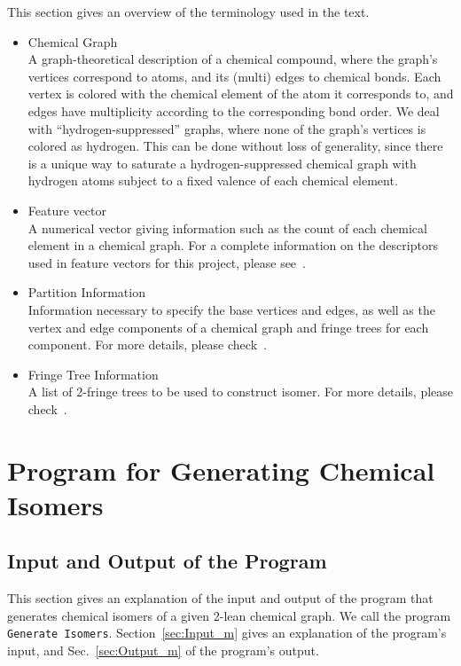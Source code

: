 \documentclass[11pt,titlepage,dvipdfmx,twoside]{article}
\begin{document}
This section gives an overview of the terminology used in the text.
%
\begin{itemize}
%
\item Chemical Graph\\
A graph-theoretical description of a chemical compound, 
where the graph's vertices correspond to atoms, and
its (multi) edges to chemical bonds.
Each vertex is colored with the chemical element of the atom it corresponds to,
and edges have multiplicity according to the corresponding bond order.
We deal with ``hydrogen-suppressed'' graphs, 
where none of the graph's vertices is colored as hydrogen.
This can be done without loss of generality,
since there is a unique way to saturate a hydrogen-suppressed chemical graph 
with hydrogen atoms subject to a fixed valence of each chemical element.


\item Feature vector\\
A numerical vector giving information such as the count of
each chemical element in a chemical graph.
For a complete information on the descriptors used in feature vectors for
this project, please see~\cite{branch}.



\item Partition Information\\
Information necessary to specify the base vertices and edges, as well as the vertex and edge components
of a chemical graph and fringe trees for each component.
For more details, please check~\cite{branch}.

\item Fringe Tree Information\\
A list of 2-fringe trees to be used to construct isomer. 
For more details, please check~\cite{branch}.


\end{itemize}


\section{Program for Generating Chemical Isomers}
\label{sec: main}

\subsection{Input and Output of the Program}
\label{sec:InOut_m}

This section gives an explanation of the input and output
of the program that generates chemical isomers
of a given 2-lean chemical graph.
We call the program {\tt Generate Isomers}.
Section~\ref{sec:Input_m} gives an explanation of the program's input, and
Sec.~\ref{sec:Output_m} of the program's output.
\end{document}
